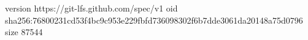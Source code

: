version https://git-lfs.github.com/spec/v1
oid sha256:76800231cd53f4bc9c953e229fbfd736098302f6b7dde3061da20148a75d0796
size 87544

